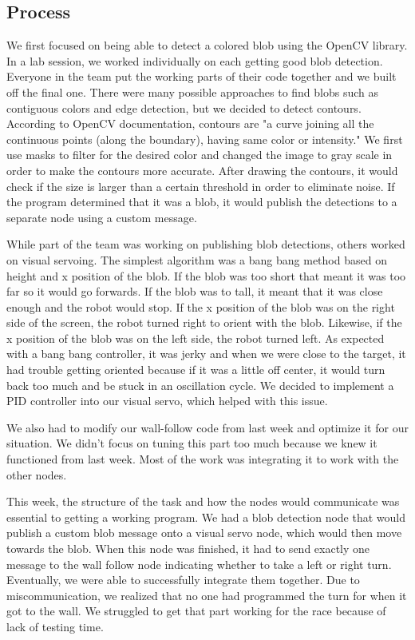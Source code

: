 \documentclass[journal, a4paper]{IEEEtran}
\begin{document}
\subsection{Process}
\par We first focused on being able to detect a colored blob using the OpenCV library. In a lab session, we worked individually on each getting good blob detection. Everyone in the team put the working parts of their code together and we built off the final one. There were many possible approaches to find blobs such as contiguous colors and edge detection, but we decided to detect contours. According to OpenCV documentation, contours are "a curve joining all the continuous points (along the boundary), having same color or intensity." \cite{opencv-docs} We first use masks to filter for the desired color and changed the image to gray scale in order to make the contours more accurate. After drawing the contours, it would check if the size is larger than a certain threshold in order to eliminate noise. If the program determined that it was a blob, it would publish the detections to a separate node using a custom message. 
\par While part of the team was working on publishing blob detections, others worked on visual servoing. The simplest algorithm was a bang bang method based on height and x position of the blob. If the blob was too short that meant it was too far so it would go forwards. If the blob was to tall, it meant that it was close enough and the robot would stop. If the x position of the blob was on the right side of the screen, the robot turned right to orient with the blob. Likewise, if the x position of the blob was on the left side, the robot turned left. As expected with a bang bang controller, it was jerky and when we were close to the target, it had trouble getting oriented because if it was a little off center, it would turn back too much and be stuck in an oscillation cycle. We decided to implement a PID controller into our visual servo, which helped with this issue. 
\par We also had to modify our wall-follow code from last week and optimize it for our situation. We didn’t focus on tuning this part too much because we knew it functioned from last week. Most of the work was integrating it to work with the other nodes.
\par This week, the structure of the task and how the nodes would communicate was essential to getting a working program. We had a blob detection node that would publish a custom blob message onto a visual servo node, which would then move towards the blob. When this node was finished, it had to send exactly one message to the wall follow node indicating whether to take a left or right turn. Eventually, we were able to successfully integrate them together. Due to miscommunication, we realized that no one had programmed the turn for when it got to the wall. We struggled to get that part working for the race because of lack of testing time. 
\end{document}
